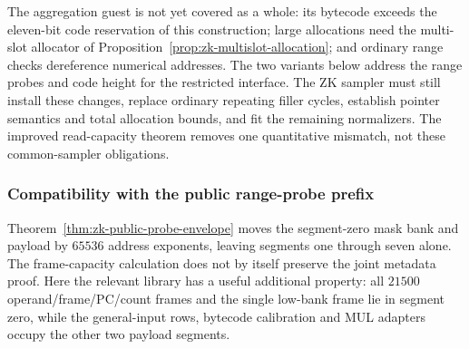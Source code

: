 The aggregation guest is not yet covered as a whole: its bytecode exceeds the eleven-bit code reservation of this construction; large allocations need the multi-slot allocator of Proposition~\ref{prop:zk-multislot-allocation}; and ordinary range checks dereference numerical addresses. The two variants below address the range probes and code height for the restricted interface. The ZK sampler must still install these changes, replace ordinary repeating filler cycles, establish pointer semantics and total allocation bounds, and fit the remaining normalizers. The improved read-capacity theorem removes one quantitative mismatch, not these common-sampler obligations.

\subsubsection{Compatibility with the public range-probe prefix}

Theorem~\ref{thm:zk-public-probe-envelope} moves the segment-zero mask bank and payload by $65536$ address exponents, leaving segments one through seven alone. The frame-capacity calculation does not by itself preserve the joint metadata proof. Here the relevant library has a useful additional property: all $21500$ operand/frame/PC/count frames and the single low-bank frame lie in segment zero, while the general-input rows, bytecode calibration and MUL adapters occupy the other two payload segments.

